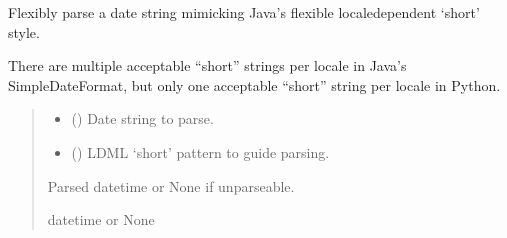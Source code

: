 \documentclass[letterpaper,10pt,english]{sphinxmanual}
\begin{document}
\begin{fulllineitems}
\label{\detokenize{apache_commons_validator_python.util:apache_commons_validator_python.util.datetime_helpers.parse_pattern_flexible}}
\pysigstartsignatures
{}
\pysigstopsignatures
\sphinxAtStartPar
Flexibly parse a date string mimicking Java’s flexible locale\sphinxhyphen{}dependent ‘short’ style.

\sphinxAtStartPar
There are multiple acceptable “short” strings per locale in Java’s SimpleDateFormat,
but only one acceptable “short” string per locale in Python.
\begin{quote}\begin{description}
\begin{itemize}
\item {} 
\sphinxAtStartPar
{} () \textendash{} Date string to parse.

\item {} 
\sphinxAtStartPar
{} () \textendash{} LDML ‘short’ pattern to guide parsing.

\end{itemize}

\sphinxAtStartPar
Parsed datetime or None if unparseable.

\sphinxAtStartPar
datetime or None

\end{description}\end{quote}

\end{fulllineitems}

\end{document}
